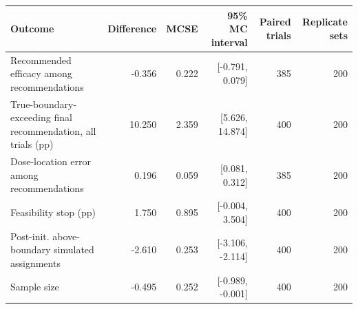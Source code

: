 \begin{tabular}{lrrrrr}
\toprule
Outcome & Difference & MCSE & 95\% MC interval & Paired trials & Replicate sets \\
\midrule
Recommended efficacy among recommendations & -0.356 & 0.222 & [-0.791, 0.079] & 385 & 200 \\
True-boundary-exceeding final recommendation, all trials (pp) & 10.250 & 2.359 & [5.626, 14.874] & 400 & 200 \\
Dose-location error among recommendations & 0.196 & 0.059 & [0.081, 0.312] & 385 & 200 \\
Feasibility stop (pp) & 1.750 & 0.895 & [-0.004, 3.504] & 400 & 200 \\
Post-init. above-boundary simulated assignments & -2.610 & 0.253 & [-3.106, -2.114] & 400 & 200 \\
Sample size & -0.495 & 0.252 & [-0.989, -0.001] & 400 & 200 \\
\bottomrule
\end{tabular}
